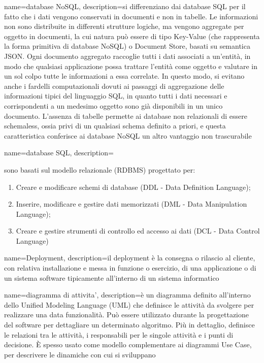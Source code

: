 \hypertarget{D}{}

{
	name=database NoSQL,
	description={si differenziano dai database SQL per il fatto che i dati vengono conservati in documenti e non in tabelle. Le informazioni non sono distribuite in differenti strutture logiche, ma vengono aggregate per oggetto in documenti, la cui natura può essere di tipo Key-Value (che rappresenta la forma primitiva di database NoSQL) o Document Store, basati su semantica JSON. Ogni documento aggregato raccoglie tutti i dati associati a un’entità, in modo che qualsiasi applicazione possa trattare l’entità come oggetto e valutare in un sol colpo tutte le informazioni a essa correlate. In questo modo, si evitano anche i fardelli computazionali dovuti ai passaggi di aggregazione delle informazioni tipici del linguaggio SQL, in quanto tutti i dati necessari e corrispondenti a un medesimo oggetto sono già disponibili in un unico documento. L’assenza di tabelle permette ai database non relazionali di essere schemaless, ossia privi di un qualsiasi schema definito a priori, e questa caratteristica conferisce ai database NoSQL un altro vantaggio non trascurabile}
}

{
	name=database SQL,
	description={sono basati sul modello relazionale (RDBMS) progettato per:
		\begin{enumerate}  
			\item Creare e modificare schemi di database (DDL - Data Definition Language);
			\item Inserire, modificare e gestire dati memorizzati (DML - Data Manipulation Language);
			\item Creare e gestire strumenti di controllo ed accesso ai dati (DCL - Data Control Language)
		\end{enumerate}
	}
}

{
	name=Deployment,
	description={il deployment è la consegna o rilascio al cliente, con relativa installazione e messa in funzione o esercizio, di una applicazione o di un sistema software tipicamente all'interno di un sistema informatico}
}

{
	name=diagramma di attivita',
	description={è un diagramma definito all'interno dello Unified Modeling Language (UML) che definisce le attività da svolgere per realizzare una data funzionalità. Può essere utilizzato durante la progettazione del software per dettagliare un determinato algoritmo. Pi\`{u} in dettaglio, definisce le relazioni tra le attività, i responsabili per le singole attività e i punti di decisione. \`{E} spesso usato come modello complementare ai diagrammi Use Case, per descrivere le dinamiche con cui si sviluppano}
}

